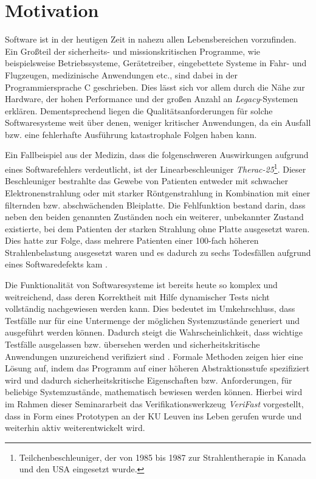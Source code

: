 \section{Motivation}

Software ist in der heutigen Zeit in nahezu allen Lebensbereichen vorzufinden. Ein Großteil der sicherheits- und missionskritischen Programme, wie beispielsweise Betriebssysteme, Gerätetreiber, eingebettete Systeme in Fahr- und Flugzeugen, medizinische Anwendungen etc.,  sind dabei in der Programmiersprache C geschrieben. Dies lässt sich vor allem durch die Nähe zur Hardware, der hohen Performance und der großen Anzahl an \emph{Legacy}-Systemen erklären. Dementsprechend liegen die Qualitätsanforderungen für solche Softwaresysteme weit über denen, weniger kritischer Anwendungen, da ein Ausfall bzw. eine fehlerhafte Ausführung katastrophale Folgen haben kann.

Ein Fallbeispiel aus der Medizin, dass die folgenschweren Auswirkungen aufgrund eines Softwarefehlers verdeutlicht, ist der Linearbeschleuniger \emph{Therac-25}\footnote{Teilchenbeschleuniger, der von 1985 bis 1987 zur Strahlentherapie in Kanada und den USA eingesetzt wurde.}. Dieser Beschleuniger bestrahlte das Gewebe von Patienten entweder mit schwacher Elektronenstrahlung oder mit starker Röntgenstrahlung in Kombination mit einer filternden bzw. abschwächenden Bleiplatte. Die Fehlfunktion bestand darin, dass neben den beiden genannten Zuständen noch ein weiterer, unbekannter Zustand existierte, bei dem Patienten der starken Strahlung ohne Platte ausgesetzt waren. Dies hatte zur Folge, dass mehrere Patienten einer 100-fach höheren Strahlenbelastung ausgesetzt waren und es dadurch zu sechs Todesfällen aufgrund eines Softwaredefekts kam \cite{Pfeifer2003,Leveson1993}.

Die Funktionalität von Softwaresysteme ist bereits heute so komplex und weitreichend, dass deren Korrektheit mit Hilfe dynamischer Tests nicht vollständig nachgewiesen werden kann. Dies bedeutet im Umkehrschluss, dass Testfälle nur für eine Untermenge der möglichen Systemzustände generiert und ausgeführt werden können. Dadurch steigt die Wahrscheinlichkeit, dass wichtige Testfälle ausgelassen bzw. übersehen werden und sicherheitskritische Anwendungen unzureichend verifiziert sind \cite{Crocker2007}. Formale Methoden zeigen hier eine Lösung auf, indem das Programm auf einer höheren Abstraktionsstufe spezifiziert wird und dadurch sicherheitskritische Eigenschaften bzw. Anforderungen, für beliebige Systemzustände, mathematisch bewiesen werden können. Hierbei wird im Rahmen dieser Seminararbeit das Verifikationswerkzeug \emph{VeriFast} vorgestellt, dass in Form eines Prototypen an der KU Leuven ins Leben gerufen wurde und weiterhin aktiv weiterentwickelt wird.

